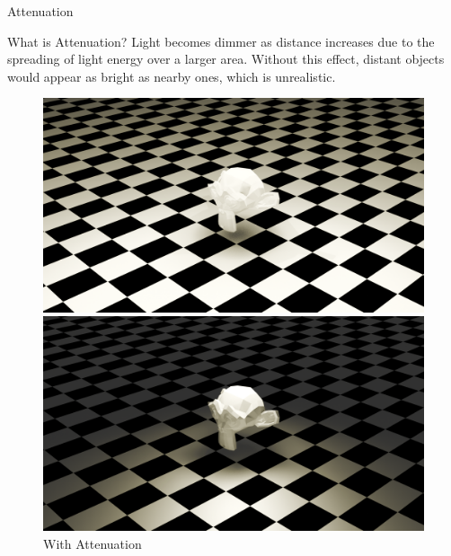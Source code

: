 \begin{frame}{Attenuation}
  \begin{conceptbox}{What is Attenuation?}
    Light becomes dimmer as distance increases due to the spreading of light energy over a larger area.
    Without this effect, distant objects would appear as bright as nearby ones, which is unrealistic.
  \end{conceptbox}
  \begin{figure}
    \centering
    \begin{minipage}{0.48\textwidth}
      \centering
      \includegraphics[width=\textwidth]{images/point_no_falloff.png}
      \caption*{No Attenuation}
    \end{minipage}
    \hfill
    \begin{minipage}{0.48\textwidth}
      \centering
      \includegraphics[width=\textwidth]{images/point.png}
      \caption*{With Attenuation}
    \end{minipage}
  \end{figure}

\end{frame}

